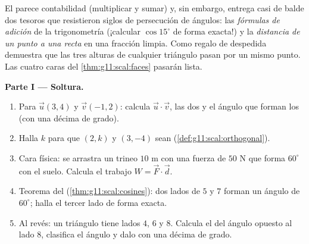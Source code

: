 \begin{problem}
\label{pb:g11:scal:1}
El  parece contabilidad (multiplicar y sumar) y, sin
embargo, entrega casi de balde dos tesoros que resistieron siglos de
persecución de ángulos: las \emph{fórmulas de adición} de la
trigonometría (¡calcular $\cos 15^\circ$ de forma exacta!) y la
\emph{distancia de un punto a una recta} en una fracción limpia. Como
regalo de despedida demuestra que las tres alturas de cualquier triángulo
pasan por un mismo punto. Las cuatro caras del \cref{thm:g11:scal:faces}
pasarán lista.

\medskip
\noindent\textbf{Parte I --- Soltura.}
\begin{enumerate}
  \item Para $\vec u(3, 4)$ y $\vec v(-1, 2)$: calcula
        $\vec u \cdot \vec v$, las dos  y el ángulo que forman los
         (con una décima de grado).
  \item Halla $k$ para que $(2, k)$ y $(3, -4)$ sean 
        (\cref{def:g11:scal:orthogonal}).
  \item Cara física: se arrastra un trineo $10$ m con una fuerza de $50$ N
        que forma $60^\circ$ con el suelo. Calcula el trabajo
        $W = \vec F \cdot \vec d$.
  \item Teorema del  (\cref{thm:g11:scal:cosines}): dos lados de $5$
        y $7$ forman un ángulo de $60^\circ$; halla el tercer lado de
        forma exacta.
  \item Al revés: un triángulo tiene lados $4$, $6$ y $8$. Calcula el
         del ángulo opuesto al lado $8$, clasifica el ángulo y dalo
        con una décima de grado.
\end{enumerate}


\end{problem}
